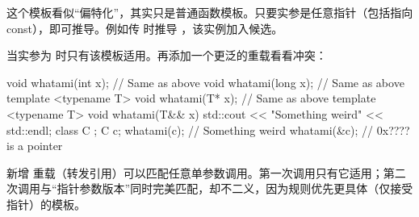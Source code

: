 这个模板看似“偏特化”，其实只是普通函数模板。只要实参是任意指针（包括指向 const），即可推导。例如传  时推导 ，该实例加入候选。

当实参为  时只有该模板适用。再添加一个更泛的重载看看冲突：

\begin{code}
void whatami(int x); // Same as above
void whatami(long x); // Same as above
template <typename T> void whatami(T* x); // Same as above
template <typename T> void whatami(T&& x) {
  std::cout << "Something weird" << std::endl;
}
class C {    };
C c;
whatami(c);    // Something weird
whatami(&c);    // 0x???? is a pointer
\end{code}

新增  重载（转发引用）可以匹配任意单参数调用。第一次调用只有它适用；第二次调用与“指针参数版本”同时完美匹配，却不二义，因为规则优先更具体（仅接受指针）的模板。

